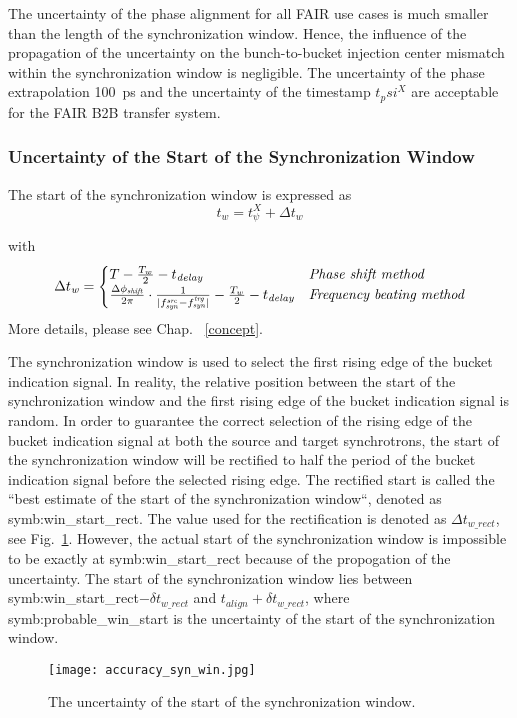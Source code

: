 \begin{itemize}
The uncertainty of the phase alignment for all FAIR use cases is much smaller than the length of the synchronization window. Hence, the influence of the propagation of the uncertainty on the bunch-to-bucket injection center mismatch within the synchronization window is negligible. The uncertainty of the phase extrapolation \SI{100}{ps} and the uncertainty of the timestamp $t_psi^X$ are acceptable for the FAIR B2B transfer system.

\end{itemize}

\subsubsection{Uncertainty of the Start of the Synchronization Window}
The start of the synchronization window is expressed as 
\begin{equation}
t_\mathit{w}=t_\psi^\mathit{X}+\Delta t_\mathit{w}\label{syn_win_start2}
\end{equation}

with 
\begin{eqnarray}
\Delta t_\mathit{w}=
\begin{cases}
T-\frac{T_w}{2}-t_\mathit{delay} &\textit{Phase shift method}\cr
\frac{\Delta \phi_\mathit{shift}}{2\pi}\cdot\frac{1}{|f_{\mathit{syn}}^\mathit{src}-f_{\mathit{syn}}^\mathit{trg}|}-\frac{T_w}{2}-t_\mathit{delay} & \textit{Frequency beating method}\cr
\end{cases}
\end{eqnarray}
More details, please see Chap. ~\ref{concept}.

The synchronization window is used to select the first rising edge of the bucket indication signal. In reality, the relative position between the start of the synchronization window and the first rising edge of the bucket indication signal is random. In order to guarantee the correct selection of the rising edge of the bucket indication signal at both the source and target synchrotrons, the start of the synchronization window will be rectified to half the period of the bucket indication signal before the selected rising edge. The rectified start is called the ``best estimate of the start of the synchronization window``, denoted as \gls{symb:win_start_rect}. The value used for the rectification is denoted as $\Delta t_\mathit{w\_rect}$, see Fig.~\ref{accuracy_syn_win}. However, the actual start of the synchronization window is impossible to be exactly at \gls{symb:win_start_rect} because of the propogation of the uncertainty. The start of the synchronization window lies between \gls{symb:win_start_rect}$-\delta t_\mathit{w\_rect}$ and $t_\mathit{align}+\delta t_\mathit{w\_rect}$, where \gls{symb:probable_win_start} is the uncertainty of the start of the synchronization window. 
\begin{figure}[!htb]
   \centering   
   \texttt{[image: accuracy\_syn\_win.jpg]}
   \caption{The uncertainty of the start of the synchronization window.}
   \label{accuracy_syn_win}
\end{figure}

